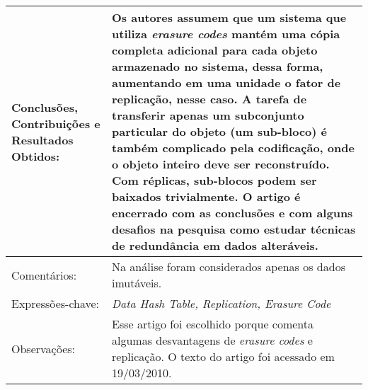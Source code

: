 \documentclass[10pt,a4paper]{article}
\begin{document}
\begin{center}
\begin{tabular}{|p{5cm}||p{10cm}|}
Conclusões, Contribuições e Resultados Obtidos: & Os autores assumem que um sistema que utiliza \emph{erasure codes} mantém uma cópia completa adicional para cada objeto armazenado no sistema, dessa forma, aumentando em uma unidade o fator de replicação, nesse caso. A tarefa de transferir apenas um subconjunto particular do objeto (um sub-bloco) é também complicado pela codificação, onde o objeto inteiro deve ser reconstruído. Com réplicas, sub-blocos podem ser baixados trivialmente. O artigo é encerrado com as conclusões e com alguns desafios na pesquisa como estudar técnicas de redundância em dados alteráveis. \\\hline
Comentários: & Na análise foram considerados apenas os dados imutáveis. \\\hline
Expressões-chave: & \emph{Data Hash Table, Replication, Erasure Code}\\\hline
Observações: & Esse artigo foi escolhido porque comenta algumas desvantagens de \emph{erasure codes} e replicação. O texto do artigo foi acessado em 19/03/2010.\\\hline

\end{tabular}
\end{center}
\end{document}

